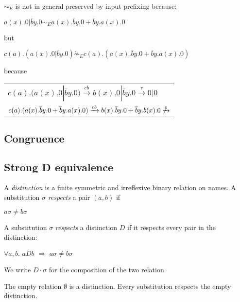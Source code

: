 \begin{example}
  $\sim_{E}$ is not in general preserved by input prefixing because:
    \begin{center}
      $a(x).0 | \overline{b}y.0 \sim_{E} a(x).\overline{b}y.0 + \overline{b}y.a(x).0$
    \end{center}
    but 
    \begin{center}
      $c(a).(a(x).0 | \overline{b}y.0) \dot{\not\sim}_{E} c(a).(a(x).\overline{b}y.0 + \overline{b}y.a(x).0)$
    \end{center}
    because
    \begin{center}
      \begin{tabular}{l}
	  $c(a).(a(x).0 | \overline{b}y.0) \xrightarrow{cb} b(x).0 | \overline{b}y.0 \xrightarrow{\tau} 0|0$
	\\
	  $c(a).(a(x).\overline{b}y.0 + \overline{b}y.a(x).0) \xrightarrow{cb} b(x).\overline{b}y.0 + \overline{b}y.b(x).0 \not\xrightarrow{\tau}$
      \end{tabular}
    \end{center}
\end{example}


\subsection{Congruence}

\subsection{Strong D equivalence}

\begin{definition}\label{distinction}
  A \emph{distinction} is a finite symmetric and irreflexive binary relation on names. A substitution $\sigma$ \emph{respects} a pair $(a,b)$ if 
  \begin{center}
     $a\sigma\neq b\sigma$
  \end{center}
  A substitution $\sigma$ \emph{respects} a distinction $D$ if it respects every pair in the distinction:
  \begin{center}
     $\forall a,b.$ $aDb$ $\Rightarrow$ $a\sigma\neq b\sigma$
  \end{center}
  We write $D \cdot \sigma$ for the composition of the two relation.
\end{definition}

\begin{example}
  The empty relation $\emptyset$ is a distinction. Every substitution respects the empty distinction.
\end{example}


